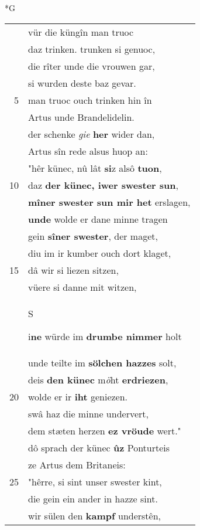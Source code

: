 \documentclass[8pt,a4paper,notitlepage]{article}
\begin{document}
\begin{table}[ht]
\begin{minipage}[t]{0.5\linewidth}
\small
\begin{center}*G
\end{center}
\begin{tabular}{rl}
 & vür die küngîn man truoc\\ 
 & daz trinken. trunken si genuoc,\\ 
 & die rîter unde die vrouwen gar,\\ 
 & si wurden deste baz gevar.\\ 
5 & man truoc ouch trinken hin în\\ 
 & Artus unde Brandelidelin.\\ 
 & der schenke \textit{gie} \textbf{her} wider dan,\\ 
 & Artus sîn rede alsus huop an:\\ 
 & "hêr künec, nû lât \textbf{si}z alsô \textbf{tuon},\\ 
10 & daz \textbf{der künec, iwer swester sun},\\ 
 & \textbf{mîner swester sun mir het} erslagen,\\ 
 & \textbf{unde} wolde er dane minne tragen\\ 
 & gein \textbf{sîner swester}, der maget,\\ 
 & diu im ir kumber ouch dort klaget,\\ 
15 & dâ wir si liezen sitzen,\\ 
 & vüere si danne mit witzen,\\ 
 & \begin{large}S\end{large}i\textbf{ne} würde im \textbf{drumbe nimmer} holt\\ 
 & unde teilte im \textbf{sölchen hazzes} solt,\\ 
 & deis \textbf{den künec} m\textit{ö}ht \textbf{erdriezen},\\ 
20 & wolde er ir \textbf{iht} geniezen.\\ 
 & swâ haz die minne undervert,\\ 
 & dem stæten herzen \textbf{ez vröude} wert."\\ 
 & dô sprach der künec \textbf{ûz} Ponturteis\\ 
 & ze Artus dem Britaneis:\\ 
25 & "hêrre, si sint unser swester kint,\\ 
 & die gein ein ander in hazze sint.\\ 
 & wir sülen den \textbf{kampf} understên,\\ 

\end{tabular}
\end{minipage}
\end{table}
\end{document}
